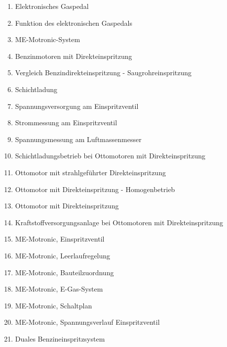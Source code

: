\begin{enumerate}
\item
  Elektronisches Gaspedal\\
\item
  Funktion des elektronischen Gaspedals\\
\item
  ME-Motronic-System\\
\item
  Benzinmotoren mit Direkteinspritzung\\
\item
  Vergleich Benzindirekteinspritzung - Saugrohreinspritzung\\
\item
  Schichtladung\\
\item
  Spannungsversorgung am Einspritzventil\\
\item
  Strommessung am Einspritzventil\\
\item
  Spannungsmessung am Luftmassenmesser\\
\item
  Schichtladungsbetrieb bei Ottomotoren mit Direkteinspritzung\\
\item
  Ottomotor mit strahlgeführter Direkteinspritzung\\
\item
  Ottomotor mit Direkteinspritzung - Homogenbetrieb\\
\item
  Ottomotor mit Direkteinspritzung\\
\item
  Kraftstoffversorgungsanlage bei Ottomotoren mit Direkteinspritzung\\
\item
  ME-Motronic, Einspritzventil\\
\item
  ME-Motronic, Leerlaufregelung\\
\item
  ME-Motronic, Bauteilzuordnung\\
\item
  ME-Motronic, E-Gas-System\\
\item
  ME-Motronic, Schaltplan\\
\item
  ME-Motronic, Spannungsverlauf Einspritzventil\\
\item
  Duales Benzineinspritzsystem
\end{enumerate}

